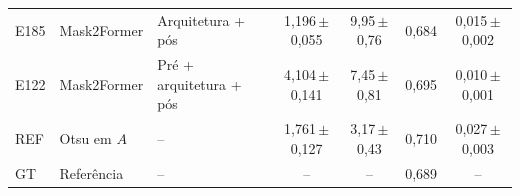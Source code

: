 \begin{table}[htbp]
\begin{sbcfitwidth}
\begin{tabular}{lllcccc}
E185 & Mask2Former & Arquitetura + pós & 1{,}196\,{\scriptsize$\pm$0{,}055} & 9{,}95\,{\scriptsize$\pm$0{,}76} & 0{,}684 & 0{,}015\,{\scriptsize$\pm$0{,}002} \\
E122 & Mask2Former & Pré + arquitetura + pós & 4{,}104\,{\scriptsize$\pm$0{,}141} & 7{,}45\,{\scriptsize$\pm$0{,}81} & 0{,}695 & 0{,}010\,{\scriptsize$\pm$0{,}001} \\
\midrule
REF & Otsu em $A$ & -- & 1{,}761\,{\scriptsize$\pm$0{,}127} & 3{,}17\,{\scriptsize$\pm$0{,}43} & 0{,}710 & 0{,}027\,{\scriptsize$\pm$0{,}003} \\
GT & Referência & -- & -- & -- & 0{,}689 & -- \\
\bottomrule
\end{tabular}
\end{sbcfitwidth}
\end{table}
